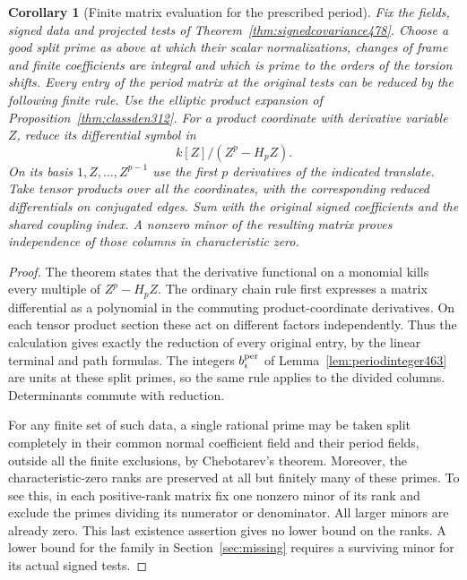 \documentclass[a4paper,11pt]{article}
\newtheorem{corollary}[proposition]{Corollary}
\theoremstyle{definition}
\theoremstyle{remark}
\numberwithin{equation}{section}
\begin{document}
\begin{corollary}[Finite matrix evaluation for the prescribed period]\leavevmode
\label{cor:splitrank480}
Fix the fields, signed data and projected tests of
Theorem~\ref{thm:signedcovariance478}. Choose a good split prime
as above at which their scalar normalizations, changes of frame
and finite coefficients are integral and which is prime to the
orders of the torsion shifts. Every entry of the period matrix
at the original tests can be reduced by the following finite rule.
Use the elliptic product expansion of
Proposition~\ref{thm:classden312}. For a product coordinate with
derivative variable \(Z\), reduce its differential symbol in
\[
                        k[Z]/(Z^p-H_pZ).
\]
On its basis \(1,Z,\ldots,Z^{p-1}\) use the first \(p\)
derivatives of the indicated translate. Take tensor products
over all the coordinates, with the corresponding reduced
differentials on conjugated edges. Sum with the original signed
coefficients and the shared coupling index. A nonzero minor of
the resulting matrix proves independence of those columns in
characteristic zero.
\end{corollary}
\begin{proof}
The theorem states that the derivative functional on a monomial
kills every multiple of \(Z^p-H_pZ\). The ordinary chain rule
first expresses a matrix differential as a polynomial in the
commuting product-coordinate derivatives. On each tensor product
section these act on different factors independently. Thus the
calculation gives exactly the reduction of every original entry,
by the linear terminal and path formulas. The integers
\(b_i^{\rm per}\) of Lemma~\ref{lem:periodinteger463} are units
at these split primes, so the same rule applies to the divided
columns. Determinants commute with reduction.

For any finite set of such data, a single rational prime may
be taken split completely in their common normal coefficient
field and their period fields, outside all the finite exclusions,
by Chebotarev's theorem. Moreover, the characteristic-zero ranks
are preserved at all but finitely many of these primes. To see
this, in each positive-rank matrix fix one nonzero minor of its
rank and exclude the primes dividing its numerator or denominator.
All larger minors are already zero. This last existence assertion
gives no lower bound on the ranks. A lower bound for the family
in Section~\ref{sec:missing} requires a surviving minor for its
actual signed tests.
\end{proof}
\end{document}
